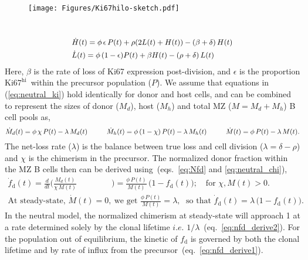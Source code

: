 \documentclass[11pt]{article}
\newcommand{\khi}{\ensuremath{\text{Ki67}^\text{hi}}~}
\newcommand\ie{$\textit{i.e.}$}
\begin{document}
\vspace{-4mm}
\begin{wrapfigure}[7]{l}{0.34\textwidth}
\centering
\texttt{[image: Figures/Ki67hilo-sketch.pdf]}%
\label{fig:ki67_sketch}
\end{wrapfigure}
~
\begin{eqnarray}
\small
\begin{aligned} 
& \dot H(t) = \phi \, \epsilon \, P(t) + \rho (2 L(t) + H(t)) - (\beta + \delta) \, H(t) \\
& \dot L(t) = \phi \, (1-\epsilon) P(t) + \beta H(t) - (\rho + \delta) \, L(t) 
\label{eq:neutral_ki}
\end{aligned}
\end{eqnarray}
Here, $\beta$ is the rate of loss of Ki67 expression post-division, and $\epsilon$ is the proportion \khi within the precursor population ($P$).
We assume that equations in (\ref{eq:neutral_ki}) hold identically for donor and host cells, and can be combined to represent the sizes of donor ($M_{d}$), host ($M_{h}$) and total MZ ($M = M_{d} + M_{h}$) B cell pools as,
{\small
\begin{equation}\small\dot M_{d}(t) = \phi \, \chi \, P(t) - \lambda \, M_{d}(t) \quad \quad \quad
\dot M_{h}(t) = \phi \, (1-\chi) \, P(t) - \lambda \, M_{h}(t) \quad \quad \quad
\dot M(t) = \phi \, P(t) - \lambda \, M(t).
\label{eq:neutral_chi}
\end{equation}
}%
The net-loss rate ($\lambda$) is the balance between true loss and cell division ($\lambda = \delta - \rho$) and $\chi$ is the chimerism in the precursor.
The normalized donor fraction within the MZ B cells then can be derived using~(eqs.~\ref{eq:Nfd} and \ref{eq:neutral_chi}),
{\small
\begin{align} 
\dot f_\text{d}(t) = \frac{d}{dt} \bigg(\frac{M_{d}(t)}{\chi \, M(t)} & \bigg)  = \frac{\phi \, P(t)}{M(t)} \, \big(1-f_\text{d}(t)\big); \quad \text{for }\chi, M(t) > 0. \label{eq:nfd_derive1} \\  
\text{At steady-state, } \dot M(t) = 0, \; & \text{ we get }  \frac{\phi \, P(t)}{M(t)} = \lambda,  \; \text{ so that }  \dot f_\text{d}(t) = \lambda \, \big(1 - f_\text{d}(t)\big). 
\label{eq:nfd_derive2}
\end{align}
}%
In the neutral model, the normalized chimerism at steady-state will approach 1 at a rate determined solely by the clonal lifetime {\ie} $1/\lambda$~(eq.~\ref{eq:nfd_derive2}). 
For the population out of equilibrium, the kinetic of $f_\text{d}$ is governed by both the clonal lifetime and by rate of influx from the precursor~(eq.~\ref{eq:nfd_derive1}).
\end{document}
